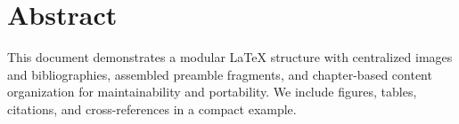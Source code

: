 \chapter*{Abstract}
This document demonstrates a modular LaTeX structure with centralized images and bibliographies, assembled preamble fragments, and chapter-based content organization for maintainability and portability. We include figures, tables, citations, and cross-references in a compact example.
